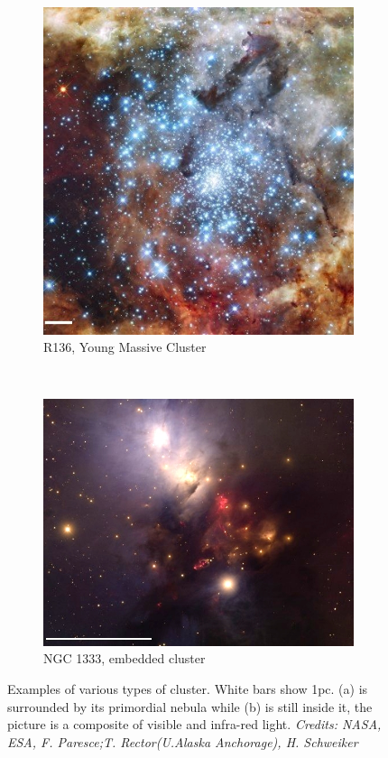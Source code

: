\begin{figure}
	 \begin{subfigure}[b]{0.415\textwidth}
        \includegraphics[width=\textwidth]{Figures/0_R136_scale.jpg}
        \caption{R136, Young Massive Cluster}
        \label{Fig:0_openglobular2.ymc}
    \end{subfigure}
    ~ 
    \begin{subfigure}[b]{0.55\textwidth}
        \includegraphics[width=\textwidth]{Figures/0_NGC1333_scale_contrast.jpg}
        \caption{NGC 1333, embedded cluster}
        \label{Fig:0_openglobular2.emb}
    \end{subfigure}
    
    \caption{Examples of various types of cluster. White bars show 1pc. (a) is  surrounded by its primordial nebula while (b) is still inside it, the picture is a composite of visible and infra-red light. \textit{Credits: NASA, ESA, F. Paresce;T. Rector(U.Alaska Anchorage), H. Schweiker}}
    \label{Fig:0_ymcemb}
\end{figure}

